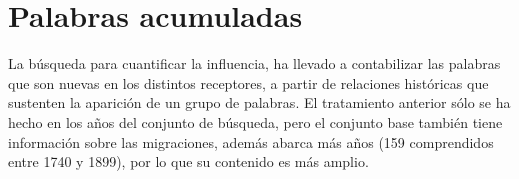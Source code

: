 \chapter{Palabras acumuladas}

La búsqueda para cuantificar la influencia, ha llevado a contabilizar las
palabras que son nuevas en los distintos receptores, a partir de relaciones históricas que sustenten la aparición de un grupo de palabras.  El tratamiento anterior sólo se ha hecho en los años del conjunto de búsqueda, pero  el conjunto base  también tiene información sobre las migraciones, además abarca más años (159 comprendidos entre 1740 y 1899), por lo que su contenido es más amplio. 













